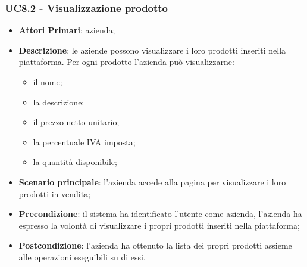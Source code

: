 \subsubsection{UC8.2 - Visualizzazione prodotto}
\begin{itemize}
	\item \textbf{Attori Primari}: azienda;
	\item \textbf{Descrizione}: le aziende possono visualizzare i loro prodotti inseriti nella piattaforma. Per ogni prodotto l'azienda può visualizzarne:
	\begin{itemize}
		\item il nome;
		\item la descrizione;
		\item il prezzo netto unitario;
		\item la percentuale IVA imposta;
		\item la quantità disponibile;
	\end{itemize}
	\item \textbf{Scenario principale}: l'azienda accede alla pagina per visualizzare i loro prodotti in vendita;	
	\item \textbf{Precondizione}: il sistema ha identificato l'utente come azienda, l'azienda ha espresso la volontà di visualizzare i propri prodotti inseriti nella piattaforma;
	\item \textbf{Postcondizione}: l'azienda ha ottenuto la lista dei propri prodotti assieme alle operazioni eseguibili su di essi.	
\end{itemize}


